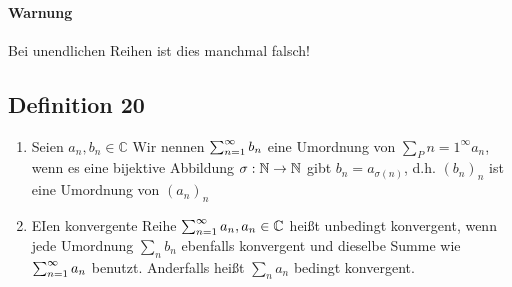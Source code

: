 \paragraph{Warnung} Bei unendlichen Reihen ist dies manchmal falsch!

\subsection{Definition 20}
\begin{enumerate}[1)]
  \item Seien $a_n, b_n \in\mathbb{C}$
    Wir nennen $\sum_{n=1}^{\infty} b_n$ eine Umordnung von $\sum_P{n=1}^\infty a_n$, wenn es eine bijektive Abbildung 
    $\sigma : \mathbb{N} \rightarrow \mathbb{N}$ gibt $b_n = a_{\sigma (n)}$, d.h. $(b_n)_n$ ist eine Umordnung von $(a_n)_n$
  \item EIen konvergente Reihe $\sum_{n=1}^{\infty} a_n, a_n \in\mathbb{C}$ heißt unbedingt konvergent, wenn jede Umordnung $\sum_n b_n$ ebenfalls konvergent und dieselbe Summe wie $\sum_{n=1}^{\infty} a_n$ benutzt. Anderfalls heißt $\sum_n a_n$ bedingt konvergent.
\end{enumerate}
